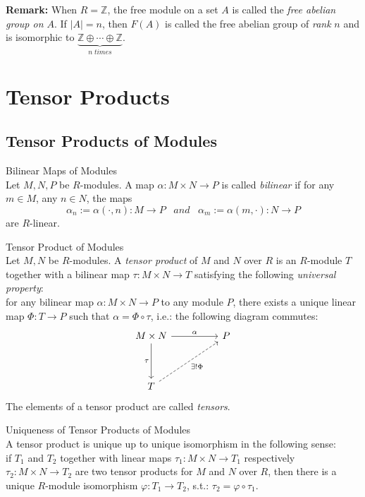 \noindent\textbf{Remark:} When $R=\mathbb{Z}$, the free module on a set $A$ is called the \textit{free abelian group on $A$}. If $|A|=n$, then $F(A)$ is called the free abelian group of \textit{rank} $n$ and is isomorphic to $\underbrace{\mathbb{Z} \oplus \cdots \oplus \mathbb{Z}}_{n \;times}$.

\section{Tensor Products}

\subsection{Tensor Products of Modules}

\begin{definition}{Bilinear Maps of Modules}\\
Let $M,N,P$ be $R$-modules. A map $\alpha: M \times N \to P$ is called \textit{bilinear} if for any $m\in M$, any $n\in N$, the maps
$$\alpha_n := \alpha (\cdot, n) : M \to P \;\;\;and\;\;\; \alpha_m := \alpha(m,\cdot): N \to P$$
are $R$-linear.
\end{definition}


\begin{definition}{Tensor Product of Modules}\\
Let $M,N$ be $R$-modules. A \textit{tensor product} of $M$ and $N$ over $R$ is an $R$-module $T$ together with a bilinear map $\tau: M\times N \to T$ satisfying the following \textit{universal property}:\\
for any bilinear map $\alpha:M \times N \to P$ to any module $P$, there exists a unique linear map $\Phi:T \to P$ such that $\alpha= \Phi \circ \tau$, i.e.: the following diagram commutes:
\[
\begin{tikzcd}
M \times N \arrow[rr, "\alpha"] \arrow[dd, "\tau"'] & & P \\
& & \\
T \arrow[uurr, dashed, "\exists !\Phi"'] & &
\end{tikzcd}
\]
The elements of a tensor product are called \textit{tensors}.
\end{definition}

\begin{proposition}{Uniqueness of Tensor Products of Modules}\\
A tensor product is unique up to unique isomorphism in the following sense:\\
if $T_1$ and $T_2$ together with linear maps $\tau_1: M\times N \to T_1$ respectively $\tau_2: M\times N \to T_2$ are two tensor products for $M$ and $N$ over $R$, then there is a unique $R$-module isomorphism $\varphi: T_1 \to T_2$, s.t.: $\tau_2= \varphi \circ \tau_1$.
\end{proposition}

